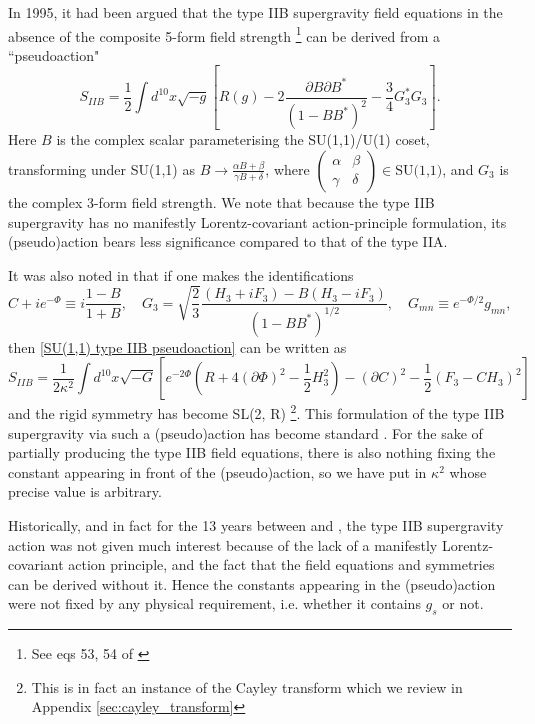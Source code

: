 In 1995, it had been argued that the type IIB supergravity field equations \cite{Schwarz:1983qr,Howe:1983sra} in the absence of the composite 5-form field strength \footnote{See eqs 53, 54 of \cite{Bergshoeff:1995as}} can be derived from a ``pseudoaction"
\begin{equation}
S_{IIB}
=\frac{1}{2}\int d^{10}x \sqrt{-g}\left[
    R(g) - 2\frac{\partial B\partial B^*}{(1-BB^*)^2}
    -\frac{3}{4}G_3^*G_3
\right].
\label{SU(1,1) type IIB pseudoaction}
\end{equation}
Here $B$ is the complex scalar parameterising the SU(1,1)/U(1) coset, transforming under SU(1,1) as $B\to \frac{\alpha B+\beta}{\gamma B+\delta}$, where $\begin{pmatrix} \alpha & \beta \\ \gamma & \delta \end{pmatrix}\in \text{SU(1,1)}$, and $G_3$ is the complex 3-form field strength.
We note that because the type IIB supergravity has no manifestly Lorentz-covariant action-principle formulation, its (pseudo)action bears less significance compared to that of the type IIA.

It was also noted in \cite{Bergshoeff:1995as} 
that if one makes the identifications
\begin{equation}
C+ie^{-\Phi}\equiv i\frac{1-B}{1+B},\quad
G_3 = \sqrt{\frac{2}{3}}\frac{(H_3+iF_3)-B(H_3-iF_3)}{(1-BB^*)^{1/2}},\quad
G_{mn}\equiv e^{-\Phi/2}g_{mn},
\end{equation}
then \eqref{SU(1,1) type IIB pseudoaction} can be written as
\begin{equation}
S_{IIB}=\frac{1}{2\kappa^2}\int d^{10}x\sqrt{-G}\left[
    e^{-2\Phi}\left(R+4(\partial\Phi)^2-\frac{1}{2}H_3^2\right)
    -(\partial C)^2 -\frac{1}{2}(F_3-CH_3)^2
\right]
\end{equation}
and the rigid symmetry has become SL(2, R) \footnote{This is in fact an instance of the Cayley transform which we review in Appendix \ref{sec:cayley_transform}}.
This formulation of the type IIB supergravity via such a (pseudo)action has become standard \cite{Schwarz:1995dk,Becker:2006dvp,Polchinski:1998rr,Ortin:2015hya}.
For the sake of partially producing the type IIB field equations, there is also nothing fixing the constant appearing in front of the (pseudo)action, so we have put in $\kappa^2$ whose precise value is arbitrary.

Historically, and in fact for the 13 years between \cite{Schwarz:1983qr,Howe:1983sra} and \cite{Bergshoeff:1995as}, the type IIB supergravity action was not given much interest because of the lack of a manifestly Lorentz-covariant action principle, and the fact that the field equations and symmetries can be derived without it. 
Hence the constants appearing in the (pseudo)action were not fixed by any physical requirement, i.e. whether it contains $g_s$ or not.

